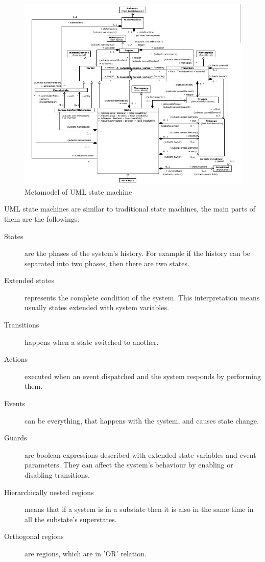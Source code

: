 \begin{figure}[htp]
\centering
\includegraphics[scale=0.5]{figures/statemachine_metamodel}
\caption{Metamodel of UML state machine}
\label{fig:statemachine_metamodel}
\end{figure}

UML state machines are similar to traditional state machines, the main parts of them are the followings:

\begin{description}
	\item[States] are the phases of the system's history. For example if the history can be separated into two phases, then there are two states. 
	\item[Extended states] represents the complete condition of the system. This interpretation means usually states extended with system variables.
	\item[Transitions] happens when a state switched to another.
	\item[Actions] executed when an event dispatched and the system responds by performing them.
	\item[Events] can be everything, that happens with the system, and causes state change.
	\item[Guards] are boolean expressions described with extended state variables and event parameters. They can affect the system's behaviour by enabling or disabling transitions.
	\item[Hierarchically nested regions] means that if a system is in a substate then it is also in the same time in all the substate's superstates.
	\item[Orthogonal regions] are regions, which are in 'OR' relation.
\end{description}

